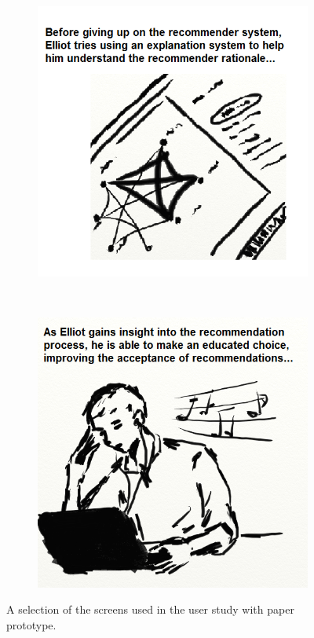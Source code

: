 \begin{figure}
\begin{subfigure}[t]{0.4\textwidth}
					\caption{}
					\label{figure:storyboard02}
	\end{subfigure}
	~
	\begin{subfigure}[t]{0.4\textwidth}
					\centering
					\includegraphics[width=\textwidth]{img/storyboard03}
					\caption{}
					\label{figure:storyboard03}
	\end{subfigure}
	~
	\begin{subfigure}[t]{0.4\textwidth}
					\centering
					\includegraphics[width=\textwidth]{img/storyboard04}
					\caption{}
					\label{figure:storyboard04}
	\end{subfigure}
	\caption{A selection of the screens used in the user study with paper prototype.}%
	\label{figure:storyboard}%
\end{figure}




